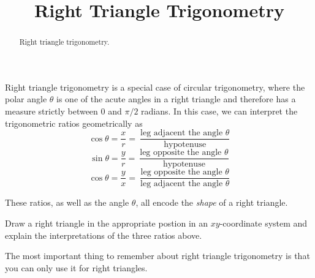 \documentclass{ximera}
\title{Right Triangle Trigonometry}
\begin{document}
\begin{abstract}
Right triangle trigonometry.
\end{abstract}
\maketitle


Right triangle trigonometry is a special case of circular trigonometry, where the polar angle $\theta$ is one of the acute angles in a right triangle and therefore has a measure strictly between $0$ and $\pi/2$ radians. In this case, we can interpret the trigonometric ratios geometrically as %
\[
   \cos \theta = \frac{x}{r}  = \ \frac{\text{leg adjacent the angle } \theta}{\text{hypotenuse}}
\]
\[
   \sin \theta = \frac{y}{r}  = \ \frac{\text{leg opposite the angle } \theta}{\text{hypotenuse}}
\]
\[
   \cos \theta = \frac{y}{x}  = \ \frac{\text{leg opposite the angle } \theta}{\text{leg adjacent the angle } \theta}
\]

These ratios, as well as the angle $\theta$, all encode the \emph{shape} of a right triangle. 

\begin{question}   \label{Q45:RightTriangle}
Draw a right triangle in the appropriate postion in an $xy$-coordinate system and explain the interpretations of the three ratios above.
\end{question}

The most important thing to remember about right triangle trigonometry is that you can only use it for right triangles.
\end{document}
